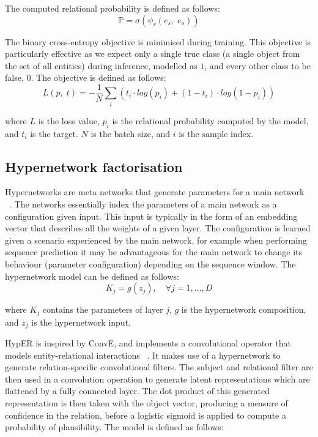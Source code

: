 \noindent The computed relational probability is defined as follows: 
\begin{equation}
	\mathbb{P} = \sigma(\psi_r(e_s, \; e_o)) 
\end{equation}

\noindent The binary cross-entropy objective is minimised during training. This objective is particularly effective as we expect only a single true class (a single object from the set of all entities) during inference, modelled as $1$, and every other class to be false, $0$. The objective is defined as follows:
\begin{equation}
	L(p, \; t) =  -\frac{1}{N}\sum_i(t_i \cdot log(p_i) + (1 - t_i) \cdot log(1 - p_i))
\end{equation}

\noindent where $ L $ is the loss value, $ p_i $ is the relational probability computed by the model, and $ t_i $ is the target. $ N $ is the batch size, and $ i $ is the sample index.

\subsection{Hypernetwork factorisation}

Hypernetworks are meta networks that generate parameters for a main network \unskip ~\citep{ha2016hypernetworks}. The networks essentially index the parameters of a main network as a configuration given input. This input is typically in the form of an embedding vector that describes all the weights of a given layer. The configuration is learned given a scenario experienced by the main network, for example when performing sequence prediction it may be advantageous for the main network to change its behaviour (parameter configuration) depending on the sequence window. The hypernetwork model can be defined as follows: 
\begin{equation}
	K_j = g(z_j), \quad \forall j = 1, \dots, D
\end{equation}

\noindent where $ K_j $ contains the parameters of layer $ j $, $ g $ is the hypernetwork composition, and $ z_j $ is the hypernetwork input. \par

\noindent HypER is inspired by ConvE, and implements a convolutional operator that models entity-relational interactions \unskip ~\citep{balazevic2019hypernetwork}. It makes use of a hypernetwork to generate relation-specific convolutional filters. The subject and relational filter are then used in a convolution operation to generate latent representations which are flattened by a fully connected layer. The dot product of this generated representation is then taken with the object vector, producing a measure of confidence in the relation, before a logistic sigmoid is applied to compute a probability of plausibility. The model is defined as follows: \newpage

